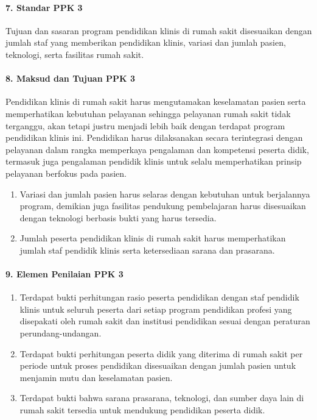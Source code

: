 \documentclass[
]{book}
\providecommand{\tightlist}{%
  \setlength{\itemsep}{0pt}\setlength{\parskip}{0pt}}
\begin{document}
\hypertarget{standar-ppk-3}{%
\paragraph*{7. Standar PPK 3}\label{standar-ppk-3}}

Tujuan dan sasaran program pendidikan klinis di rumah sakit disesuaikan dengan jumlah staf yang memberikan pendidikan klinis, variasi dan jumlah pasien, teknologi, serta fasilitas rumah sakit.

\hypertarget{maksud-dan-tujuan-ppk-3}{%
\paragraph*{8. Maksud dan Tujuan PPK 3}\label{maksud-dan-tujuan-ppk-3}}

Pendidikan klinis di rumah sakit harus mengutamakan keselamatan pasien serta memperhatikan kebutuhan pelayanan sehingga pelayanan rumah sakit tidak terganggu, akan tetapi justru menjadi lebih baik dengan terdapat program pendidikan klinis ini. Pendidikan harus dilaksanakan secara terintegrasi dengan pelayanan dalam rangka memperkaya pengalaman dan kompetensi peserta didik, termasuk juga pengalaman pendidik klinis untuk selalu memperhatikan prinsip pelayanan berfokus pada pasien.

\begin{enumerate}
\def\labelenumi{\alph{enumi}.}
\tightlist
\item
  Variasi dan jumlah pasien harus selaras dengan kebutuhan untuk berjalannya program, demikian juga fasilitas pendukung pembelajaran harus disesuaikan dengan teknologi berbasis bukti yang harus tersedia.
\item
  Jumlah peserta pendidikan klinis di rumah sakit harus memperhatikan jumlah staf pendidik klinis serta ketersediaan sarana dan prasarana.
\end{enumerate}

\hypertarget{elemen-penilaian-ppk-3}{%
\paragraph*{9. Elemen Penilaian PPK 3}\label{elemen-penilaian-ppk-3}}

\begin{enumerate}
\def\labelenumi{\alph{enumi}.}
\tightlist
\item
  Terdapat bukti perhitungan rasio peserta pendidikan dengan staf pendidik klinis untuk seluruh peserta dari setiap program pendidikan profesi yang disepakati oleh rumah sakit dan institusi pendidikan sesuai dengan peraturan perundang-undangan.
\item
  Terdapat bukti perhitungan peserta didik yang diterima di rumah sakit per periode untuk proses pendidikan disesuaikan dengan jumlah pasien untuk menjamin mutu dan keselamatan pasien.
\item
  Terdapat bukti bahwa sarana prasarana, teknologi, dan sumber daya lain di rumah sakit tersedia untuk mendukung pendidikan peserta didik.
\end{enumerate}
\end{document}
